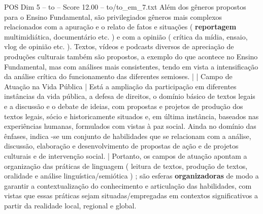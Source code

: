 \begin{textsample}{POS Dim 5 – to – Score 12.00 – to/to\_em\_7.txt}
Além dos gêneros propostos para o Ensino Fundamental, são privilegiados gêneros mais complexos relacionados com a apuração e o relato de fatos e situações ( \textbf{reportagem} multimidiática, documentário etc. ) e com a opinião ( crítica da mídia, ensaio, vlog de opinião etc. ).
Textos, vídeos e podcasts diversos de apreciação de produções culturais também são propostos, a exemplo do que acontece no Ensino Fundamental, mas com análises mais consistentes, tendo em vista a intensificação da análise crítica do funcionamento das diferentes semioses. | | Campo de Atuação na Vida Pública | Está a ampliação da participação em diferentes instâncias da vida pública, a defesa de direitos, o domínio básico de textos legais e a discussão e o debate de ideias, com propostas e projetos de produção dos textos legais, sócio e historicamente situados e, em última instância, baseados nas experiências humanas, formulados com vistas à paz social.
Ainda no domínio das ênfases, indica -se um conjunto de habilidades que se relacionam com a análise, discussão, elaboração e desenvolvimento de propostas de ação e de projetos culturais e de intervenção social. | Portanto, os campos de atuação apontam a organização das práticas de linguagem ( leitura de textos, produção de textos, oralidade e análise linguística/semiótica ) ; são esferas \textbf{organizadoras} de modo a garantir a contextualização do conhecimento e articulação das habilidades, com vistas que essas práticas sejam situadas/empregadas em contextos significativos a partir da realidade local, regional e global.

\end{textsample}
